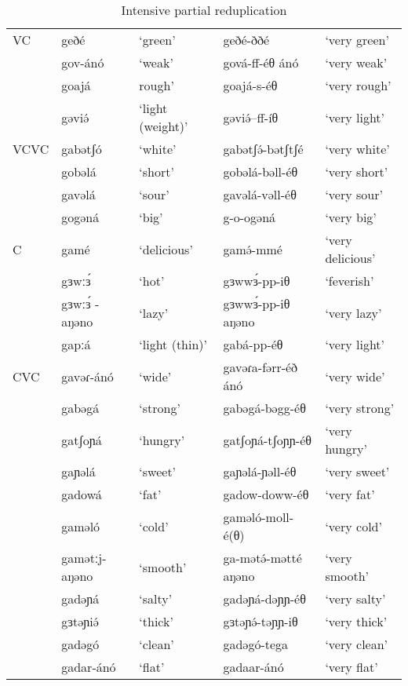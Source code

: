 \begin{table}
\begin{tabular}{lllll}
VC&	geðé	&	‘green’	&	geðé-ððé		&	`very green' \\
&	gov-ánó	&	‘weak’	&	gová-ff-éθ ánó	&	‘very weak’\\
&	goajá	&	rough’	&	goajá-s-éθ		&	‘very rough’\\
&	gəviə́	&	‘light (weight)’&	gəviə́--ff-íθ	&	‘very light’\\
VCVC&	gabətʃó &	‘white’&	gabətʃə́-bətʃtʃé	&	`very white' \\
&	gobəlá	&	‘short’	&	gobəlá-bəll-éθ	&	‘very short’ \\
&	gavəlá	&	‘sour’	&	gavəlá-vəll-éθ	&	‘very sour’\\
&	gogəná	&	‘big’	&	g-o-ogəná		&	‘very big’\\
C&	gamé	&	‘delicious’&	gamə́-mmé		&	‘very delicious’\\
&	gɜwːɜ́	&	‘hot’	&	gɜwwɜ́-pp-iθ		&	‘feverish’\\ %
&	gɜwːɜ́ -aŋəno&	‘lazy’&	gɜwwɜ́-pp-iθ aŋəno	&	‘very lazy’\\
&	gapːá	&	‘light (thin)’&	gabá-pp-éθ	&	‘very light’\\
CVC&	gavəɾ-ánó 	&	‘wide’&	gavəɾa-fərr-éð ánó	&	‘very wide’\\
&	gabəgá	&	‘strong’&	gabəgá-bəgg-éθ	&	‘very strong’\\
&	gatʃoɲá	&	‘hungry’&	gatʃoɲá-tʃoɲɲ-éθ	&	‘very hungry’\\
&	gaɲəlá	&	‘sweet’	&	gaɲəlá-ɲəll-éθ	&	‘very sweet’\\
&	gadowá	&	‘fat’	&	gadow-doww-éθ	&	‘very fat’\\
&	gaməló	&	‘cold’	&	gaməló-moll-é(θ)	&	‘very cold’\\
&	gamətːj-aŋəno &	‘smooth’&	ga-mətə́-mətté aŋəno	&	‘very smooth’\\
&	gadəɲá	&	‘salty’	&	gadəɲá-dəɲɲ-éθ	&	‘very salty’\\
&	gɜtəɲiə́	&	‘thick’	&	gɜtəɲə́-təɲɲ-iθ	&	‘very thick’\\
&	gadəgó	&	‘clean’	&	gadəgó-tega	&	‘very clean’\\
&	gadar-ánó&	‘flat’	&	gadaar-ánó	&	‘very flat’\\
\end{tabular}	
\caption{Intensive partial reduplication}
\label{tab:ch10:1}
\end{table}

